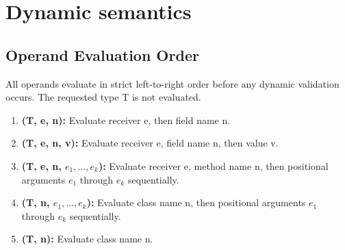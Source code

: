 \section{Dynamic semantics}
\subsection*{Operand Evaluation Order}
All operands evaluate in strict left-to-right order before any dynamic
validation occurs. The requested type T is not evaluated.
\begin{enumerate}
  \item \textbf{(T, e, n):} Evaluate receiver e, then field name n.
  \item \textbf{(T, e, n, v):} Evaluate receiver e, field name n, then value v.
  \item \textbf{(T, e, n, $e_1, \ldots, e_k$):} Evaluate receiver
    e, method name n, then positional arguments $e_1$ through $e_k$ sequentially.
  \item \textbf{(T, n, $e_1, \ldots, e_k$):} Evaluate class
    name n, then positional arguments $e_1$ through $e_k$ sequentially.
  \item \textbf{(T, n):} Evaluate class name n.
\end{enumerate}

